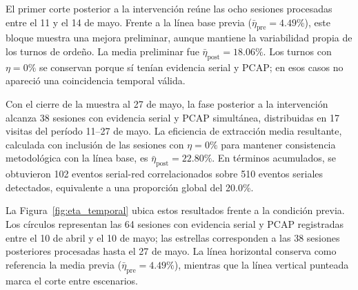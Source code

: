 El primer corte posterior a la intervención reúne las ocho sesiones procesadas entre el 11 y el 14 de mayo. Frente a la línea base previa ($\bar{\eta}_{\text{pre}}=4.49\%$), este bloque muestra una mejora preliminar, aunque mantiene la variabilidad propia de los turnos de ordeño. La media preliminar fue $\bar{\eta}_{\text{post}}=18.06\%$. Los turnos con $\eta=0\%$ se conservan porque sí tenían evidencia serial y \ac{PCAP}; en esos casos no apareció una coincidencia temporal válida.

Con el cierre de la muestra al 27 de mayo, la fase posterior a la intervención alcanza 38 sesiones con evidencia serial y PCAP simultánea, distribuidas en 17 visitas del período 11--27 de mayo. La eficiencia de extracción media resultante, calculada con inclusión de las sesiones con $\eta=0\%$ para mantener consistencia metodológica con la línea base, es $\bar{\eta}_{\text{post}}=22.80\%$. En términos acumulados, se obtuvieron 102 eventos serial-red correlacionados sobre 510 eventos seriales detectados, equivalente a una proporción global del 20.0\%.

La Figura~\ref{fig:eta_temporal} ubica estos resultados frente a la condición previa. Los círculos representan las 64 sesiones con evidencia serial y PCAP registradas entre el 10 de abril y el 10 de mayo; las estrellas corresponden a las 38 sesiones posteriores procesadas hasta el 27 de mayo. La línea horizontal conserva como referencia la media previa ($\bar{\eta}_{\text{pre}}=4.49\%$), mientras que la línea vertical punteada marca el corte entre escenarios.

